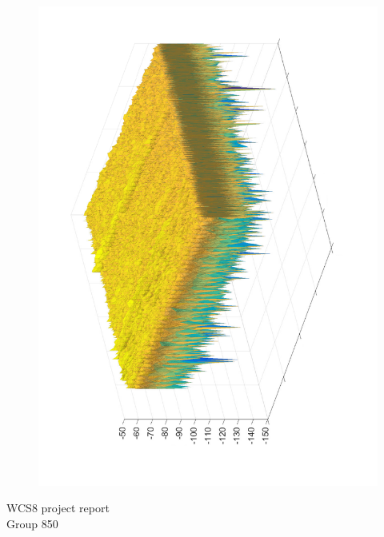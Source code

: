 \begin{titlepage}
\begin{figure}[H]
\centering
\includegraphics[height = 0.95\textwidth, angle = -90]{figures/Frontpage1.pdf}
\end{figure}
\vfill
  \begin{center}
    {\large
      WCS8 project report %
    }\\
    \vspace{0.2cm}
    {\Large
      Group 850%
    }
  \end{center}
  \vspace{1 cm}
\end{titlepage}

\clearpage